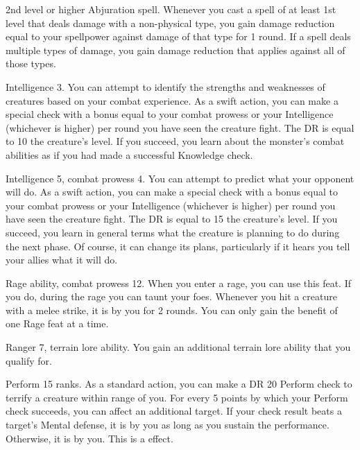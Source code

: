 \featpre 2nd level or higher Abjuration spell.
\featben Whenever you cast a spell of at least 1st level that deals damage with a non-physical type, you gain damage reduction equal to your spellpower against damage of that type for 1 round.
If a spell deals multiple types of damage, you gain damage reduction that applies against all of those types.

\featpre Intelligence 3.
\featben You can attempt to identify the strengths and weaknesses of creatures based on your combat experience.
As a swift action, you can make a special check with a bonus equal to your combat prowess or your Intelligence (whichever is higher)  per round you have seen the creature fight.
The DR is equal to 10 \add the creature's level.
If you succeed, you learn about the monster's combat abilities as if you had made a successful Knowledge check.

\featpres Intelligence 5, combat prowess 4.
\featben You can attempt to predict what your opponent will do.
As a swift action, you can make a special check with a bonus equal to your combat prowess or your Intelligence (whichever is higher)  per round you have seen the creature fight.
The DR is equal to 15 \add the creature's level.
If you succeed, you learn in general terms what the creature is planning to do during the next phase.
Of course, it can change its plans, particularly if it hears you tell your allies what it will do.

\featpres Rage ability, combat prowess 12.
\featben When you enter a rage, you can use this feat. If you do, during the rage you can taunt your foes.
Whenever you hit a creature with a melee strike, it is \taunted by you for 2 rounds.
 You can only gain the benefit of one Rage feat at a time.

\featpres Ranger 7, terrain lore ability.
\featben You gain an additional terrain lore ability that you qualify for.

\featpre Perform 15 ranks.
\featben As a standard action, you can make a DR 20 Perform check to terrify a creature within \rngmed range of you.
For every 5 points by which your Perform check succeeds, you can affect an additional target.
If your check result beats a target's Mental defense, it is \frightened by you as long as you sustain the performance.
Otherwise, it is \shaken by you.
This is a  effect.

